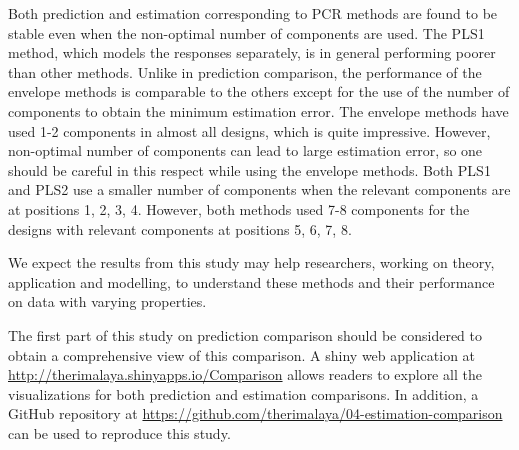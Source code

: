 \documentclass[12pt,3p,authoryear]{elsarticle}
\begin{document}
Both prediction and estimation corresponding to PCR methods are found to be stable even when the non-optimal number of components are used. The PLS1 method, which models the responses separately, is in general performing poorer than other methods. Unlike in prediction comparison, the performance of the envelope methods is comparable to the others except for the use of the number of components to obtain the minimum estimation error. The envelope methods have used 1-2 components in almost all designs, which is quite impressive. However, non-optimal number of components can lead to large estimation error, so one should be careful in this respect while using the envelope methods. Both PLS1 and PLS2 use a smaller number of components when the relevant components are at positions 1, 2, 3, 4. However, both methods used 7-8 components for the designs with relevant components at positions 5, 6, 7, 8.

We expect the results from this study may help researchers, working on theory, application and modelling, to understand these methods and their performance on data with varying properties.

The first part of this study \citep{rimal2019pred} on prediction comparison should be considered to obtain a comprehensive view of this comparison. A shiny \citep{shiny} web application at \url{http://therimalaya.shinyapps.io/Comparison} allows readers to explore all the visualizations for both prediction and estimation comparisons. In addition, a GitHub repository at \url{https://github.com/therimalaya/04-estimation-comparison} can be used to reproduce this study.

\hypertarget{refs}{}


\renewcommand\refname{References}

\end{document}
